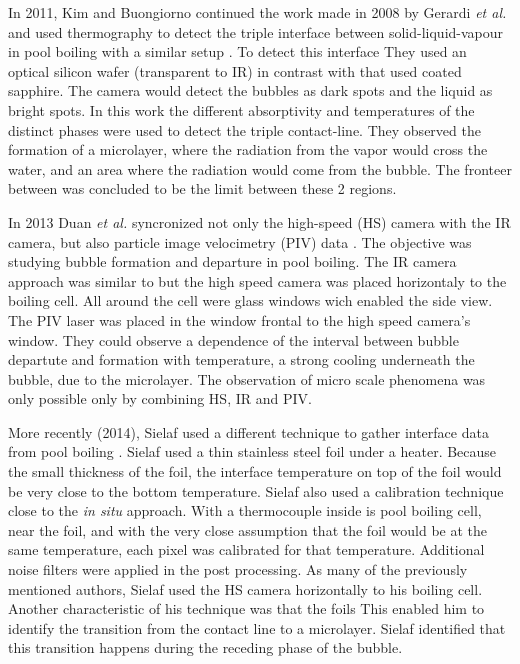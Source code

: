 \par In 2011, Kim and Buongiorno continued the work made in 2008 by Gerardi \textit{et al.} and used thermography to detect the triple interface between solid-liquid-vapour in pool boiling with a similar setup \cite{kim2011detection}. To detect this interface They used an optical silicon wafer (transparent to IR) in contrast with \cite{Gerardi2008} that used coated sapphire. The camera would detect the bubbles as dark spots and the liquid as bright spots. In this work the different absorptivity and temperatures of the distinct phases were used to detect the triple contact-line. They observed the formation of a microlayer, where the radiation from the vapor would cross the water, and an area where the radiation would come from the bubble. The fronteer between was concluded to be the limit between these 2 regions. \\

\par In 2013 Duan \textit{et al.} syncronized not only the high-speed (HS) camera with the IR camera, but also particle image velocimetry (PIV) data \cite{duan2013synchronized}. The objective was studying bubble formation and departure in pool boiling. The IR camera approach was similar to \cite{Gerardi2008} but the high speed camera was placed horizontaly to the boiling cell. All around the cell were glass windows wich enabled the side view. The PIV laser was placed in the window frontal to the high speed camera's window. They could observe a dependence of the interval between bubble departute and formation with temperature, a strong cooling underneath the bubble, due to the microlayer. The observation of micro scale phenomena was only possible only by combining HS, IR and PIV. \\


\par More recently (2014), Sielaf used a different technique to gather interface data from pool boiling \cite{sielaff2014experimental}. Sielaf used a thin stainless steel foil under a heater. Because the small thickness of the foil, the interface temperature on top of the foil would be very close to the bottom temperature. Sielaf also used a calibration technique close to the \textit{in situ} approach. With a thermocouple inside is pool boiling cell, near the foil, and with the very close assumption that the foil would be at the same temperature, each pixel was calibrated for that temperature. Additional noise filters were applied in the post processing. As many of the previously mentioned authors, Sielaf used the HS camera horizontally to his boiling cell. Another characteristic of his technique was that the foils  This enabled him to identify the transition from the contact line to a microlayer. Sielaf identified that this transition happens during the receding phase of the bubble. \\

